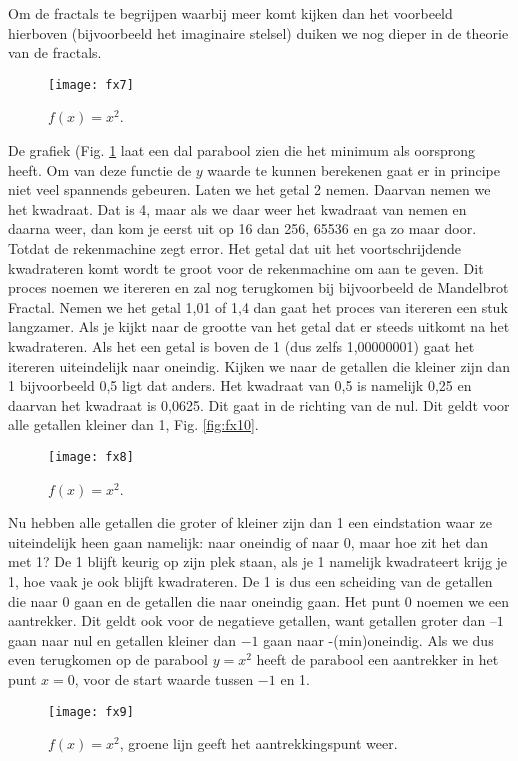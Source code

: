 \documentclass[11pt,fleqn]{book} %
\begin{document}
Om de fractals te begrijpen waarbij meer komt kijken dan het voorbeeld hierboven (bijvoorbeeld het imaginaire stelsel) duiken we nog dieper in de theorie van de fractals.
\begin{figure}[h]
	\centering\texttt{[image: fx7]}
	\caption{$f(x)=x^2$.}
	\label{fig:fx7}
\end{figure}
De grafiek (Fig. \ref{fig:fx7} laat een dal parabool zien die het minimum als oorsprong heeft. Om van deze functie de $y$ waarde te kunnen berekenen gaat er in principe niet veel spannends gebeuren. Laten we het getal 2 nemen. Daarvan nemen we het kwadraat. Dat is 4, maar als we daar weer het kwadraat van nemen en daarna weer, dan kom je eerst uit op 16 dan 256, 65536 en ga zo maar door. Totdat de rekenmachine zegt error. Het getal dat uit het voortschrijdende kwadrateren komt wordt te groot voor de rekenmachine om aan te geven. Dit proces noemen we itereren en zal nog terugkomen bij bijvoorbeeld de Mandelbrot Fractal.
Nemen we het getal 1,01 of 1,4 dan gaat het proces van itereren een stuk langzamer. Als je kijkt naar de grootte van het getal dat er steeds uitkomt na het kwadrateren. Als het een getal is boven de 1 (dus zelfs 1,00000001) gaat het itereren uiteindelijk naar oneindig. Kijken we naar de getallen die kleiner zijn dan 1 bijvoorbeeld 0,5 ligt dat anders. Het kwadraat van 0,5 is namelijk 0,25 en daarvan het kwadraat is 0,0625. Dit gaat in de richting van de nul.
Dit geldt voor alle getallen kleiner dan 1, Fig. \ref{fig:fx10}.
\begin{figure}[h]
	\centering\texttt{[image: fx8]}
	\caption{$f(x)=x^2$.}
	\label{fig:fx8}
\end{figure}
Nu hebben alle getallen die groter of kleiner zijn dan 1 een eindstation waar ze uiteindelijk heen gaan namelijk: naar oneindig of naar 0, maar hoe zit het dan met 1? De 1 blijft keurig op zijn plek staan, als je 1 namelijk kwadrateert krijg je 1, hoe vaak je ook blijft kwadrateren. De 1 is dus een scheiding van de getallen die naar 0 gaan en de getallen die naar oneindig gaan. Het punt 0 noemen we een aantrekker. Dit geldt ook voor de negatieve getallen, want getallen groter dan $–1$ gaan naar nul en getallen kleiner dan $-1$ gaan naar -(min)oneindig. Als we dus even terugkomen op de parabool $y=x^2$ heeft de parabool een aantrekker in het punt $x=0$, voor de start waarde tussen $-1$ en 1.
\begin{figure}[h]
	\centering\texttt{[image: fx9]}
	\caption{$f(x)=x^2$, groene lijn geeft het aantrekkingspunt weer.}
	\label{fig:fx9}
\end{figure}
\end{document}
